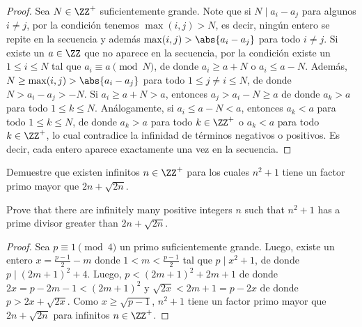 \begin{proof}
	Sea $N\in\ZZ^+$ suficientemente grande. Note que si $N\mid a_i-a_j$ para algunos $i\ne j$, por la condición tenemos $\max(i,j)>N$, es decir, ningún entero se repite en la secuencia y además $\max(i,j)>\abs{a_i-a_j}$ para todo $i\ne j$. Si existe un $a\in\ZZ$ que no aparece en la secuencia, por la condición existe un $1\le i\le N$ tal que $a_i\equiv a\pmod N$, de donde $a_i\ge a+N$ o $a_i\le a-N$. Además, $N\ge\max(i,j)>\abs{a_i-a_j}$ para todo $1\le j\ne i\le N$, de donde $N>a_i-a_j>-N$. Si $a_i\ge a+N>a$, entonces $a_j>a_i-N\ge a$ de donde $a_k>a$ para todo $1\le k\le N$. Análogamente, si $a_i\le a-N<a$, entonces $a_k<a$ para todo $1\le k\le N$, de donde $a_k>a$ para todo $k\in\ZZ^+$ o $a_k<a$ para todo $k\in\ZZ^+$, lo cual contradice la infinidad de términos negativos o positivos. Es decir, cada entero aparece exactamente una vez en la secuencia.
\end{proof}

\begin{probEG}
	Demuestre que existen infinitos $n\in\ZZ^+$ para los cuales $n^2+1$ tiene un factor primo mayor que $2n+\sqrt{2n}$.
	\begin{hint}
		Prove that there are infinitely many positive integers $n$ such that $n^2+1$ has a prime divisor greater than $2n+\sqrt{2n}$.
	\end{hint}
\end{probEG}

\begin{proof}
	Sea $p\equiv 1\pmod 4$ un primo suficientemente grande. Luego, existe un entero $x=\frac{p-1}{2}-m$ donde $1<m<\frac{p-1}{2}$ tal que $p\mid x^2+1$, de donde $p\mid(2m+1)^2+4$. Luego, $p<(2m+1)^2+2m+1$ de donde $2x=p-2m-1<(2m+1)^2$ y $\sqrt{2x}<2m+1=p-2x$ de donde $p>2x+\sqrt{2x}$. Como $x\ge\sqrt{p-1}$, $n^2+1$ tiene un factor primo mayor que $2n+\sqrt{2n}$ para infinitos $n\in\ZZ^+$.
\end{proof}
